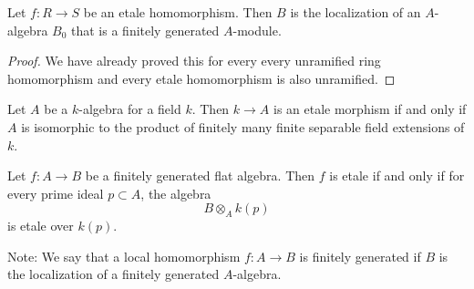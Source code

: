 \documentclass[a4paper]{article}
\begin{document}
\begin{crl}{}{} Let $f:R\to S$ be an etale homomorphism. Then $B$ is the localization of an $A$-algebra $B_0$ that is a finitely generated $A$-module. \tcbline
\begin{proof}
We have already proved this for every every unramified ring homomorphism and every etale homomorphism is also unramified. 
\end{proof}
\end{crl}

\begin{prp}{}{} Let $A$ be a $k$-algebra for a field $k$. Then $k\to A$ is an etale morphism if and only if $A$ is isomorphic to the product of finitely many finite separable field extensions of $k$. 
\end{prp}

\begin{prp}{}{} Let $f:A\to B$ be a finitely generated flat algebra. Then $f$ is etale if and only if for every prime ideal $p\subset A$, the algebra $$B\otimes_A k(p)$$ is etale over $k(p)$. 
\end{prp}

Note: We say that a local homomorphism $f:A\to B$ is finitely generated if $B$ is the localization of a finitely generated $A$-algebra. 
\end{document}
